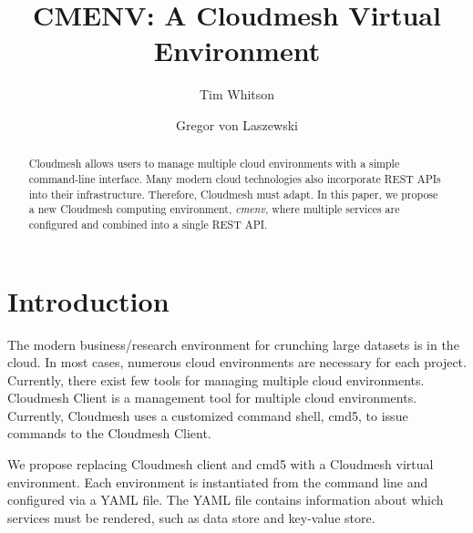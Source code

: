 
\title{CMENV: A Cloudmesh Virtual Environment}

\author{Tim Whitson}

\author{Gregor von Laszewski}

\renewcommand{\shortauthors}{T. Whitson}

\begin{abstract}
Cloudmesh allows users to manage multiple cloud environments with a simple
command-line interface. Many modern cloud technologies also incorporate REST
APIs into their infrastructure. Therefore, Cloudmesh must adapt. In this
paper, we propose a new Cloudmesh computing environment, \textit{cmenv},
where multiple services are configured and combined into a single REST API.
\end{abstract}


\maketitle

\section{Introduction}

The modern business/research environment for crunching large datasets is
in the cloud. In most cases, numerous cloud environments are necessary for
each project. Currently, there exist few tools for managing multiple cloud
environments. Cloudmesh Client is a management tool for multiple cloud
environments. Currently, Cloudmesh uses a customized command shell, cmd5,
to issue commands to the Cloudmesh Client.


We propose replacing Cloudmesh client and cmd5 with a Cloudmesh virtual
environment. Each environment is instantiated from the command line and
configured via a YAML file. The YAML file contains information about which
services must be rendered, such as data store and key-value store.

